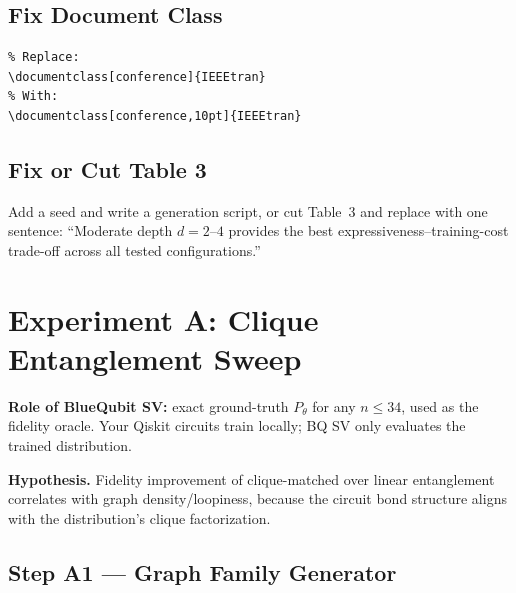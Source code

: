 \documentclass[11pt]{article}
\begin{document}
\subsection{Fix Document Class}

\begin{lstlisting}
% Replace:
\documentclass[conference]{IEEEtran}
% With:
\documentclass[conference,10pt]{IEEEtran}
\end{lstlisting}

\subsection{Fix or Cut Table 3}

Add a seed and write a generation script, or cut Table~3 and replace
with one sentence: ``Moderate depth $d = 2$--$4$ provides the best
expressiveness--training-cost trade-off across all tested
configurations.''

\section{Experiment A: Clique Entanglement Sweep}

\textbf{Role of BlueQubit SV:} exact ground-truth $P_\theta$ for any
$n \leq 34$, used as the fidelity oracle. Your Qiskit circuits
train locally; BQ SV only evaluates the trained distribution.

\textbf{Hypothesis.} Fidelity improvement of clique-matched over linear
entanglement correlates with graph density/loopiness, because the
circuit bond structure aligns with the distribution's clique
factorization.

\subsection{Step A1 --- Graph Family Generator}
\end{document}
